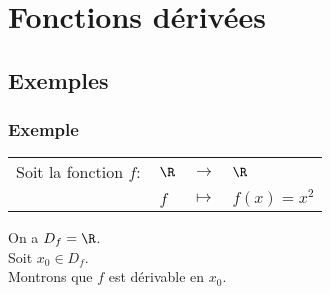 \section{Fonctions dérivées}

\subsection{Exemples}

\subsubsection{Exemple }

\begin{tabular}{llll}
Soit la fonction $f :$ & $\R$ & $\longrightarrow$ & $\R$ \\
& $f$ & $\longmapsto$ & $f(x) = x^2$ \\
\end{tabular}

On a $D_f = \R$. \\

Soit $x_0 \in D_f$. \\

Montrons que $f$ est dérivable en $x_0$. \\

